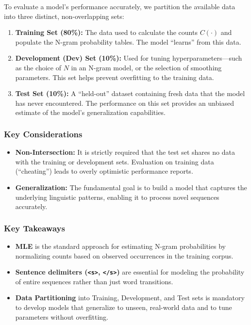 \documentclass[
  italian,
  11pt,
]{article}
\providecommand{\tightlist}{%
  \setlength{\itemsep}{0pt}\setlength{\parskip}{0pt}}
\begin{document}
To evaluate a model's performance accurately, we partition the available
data into three distinct, non-overlapping sets:

\begin{enumerate}
\def\labelenumi{\arabic{enumi}.}
\tightlist
\item
  \textbf{Training Set (80\%):} The data used to calculate the counts
  \(C(\cdot)\) and populate the N-gram probability tables. The model
  ``learns'' from this data.
\item
  \textbf{Development (Dev) Set (10\%):} Used for tuning
  hyperparameters---such as the choice of \(N\) in an N-gram model, or
  the selection of smoothing parameters. This set helps prevent
  overfitting to the training data.
\item
  \textbf{Test Set (10\%):} A ``held-out'' dataset containing fresh data
  that the model has never encountered. The performance on this set
  provides an unbiased estimate of the model's generalization
  capabilities.
\end{enumerate}

\subsubsection{Key Considerations}\label{key-considerations}

\begin{itemize}
\tightlist
\item
  \textbf{Non-Intersection:} It is strictly required that the test set
  shares no data with the training or development sets. Evaluation on
  training data (``cheating'') leads to overly optimistic performance
  reports.
\item
  \textbf{Generalization:} The fundamental goal is to build a model that
  captures the underlying linguistic patterns, enabling it to process
  novel sequences accurately.
\end{itemize}

\subsubsection{Key Takeaways}\label{key-takeaways-7}

\begin{itemize}
\tightlist
\item
  \textbf{MLE} is the standard approach for estimating N-gram
  probabilities by normalizing counts based on observed occurrences in
  the training corpus.
\item
  \textbf{Sentence delimiters (\texttt{\textless{}s\textgreater{}},
  \texttt{\textless{}/s\textgreater{}})} are essential for modeling the
  probability of entire sequences rather than just word transitions.
\item
  \textbf{Data Partitioning} into Training, Development, and Test sets
  is mandatory to develop models that generalize to unseen, real-world
  data and to tune parameters without overfitting.
\end{itemize}
\end{document}
